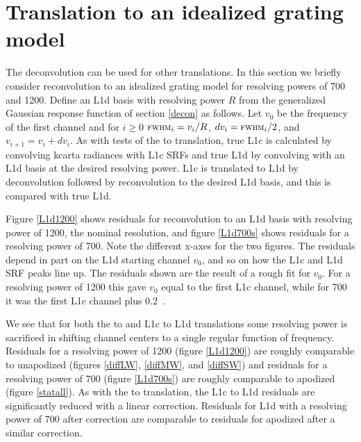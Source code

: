 \documentclass[11pt]{article}
\begin{document}
\FloatBarrier
\section{Translation to an idealized grating model}
\label{airsL1d}


The {\airs} deconvolution can be used for other translations.  
In this section we briefly consider reconvolution to an idealized
grating model for resolving powers of 700 and 1200.  Define an
{\airs} L1d basis with resolving power $R$ from the generalized
Gaussian response function of section \ref{decon} as follows.
Let $v_0$ be the frequency of the first channel and for $i\ge0$
$\mbox{\small\textsc{fwhm}}_i = v_i / R$, $dv_i = \mbox{\small\textsc{fwhm}}_i / 2$, and $v_{i+1} = v_i +
dv_i$.  As with tests of the {\airs} to {\cris} translation, true
L1c is calculated by convolving kcarta radiances with {\airs} L1c
SRFs and true L1d by convolving with an L1d basis at the desired
resolving power.  L1c is translated to L1d by deconvolution followed
by reconvolution to the desired L1d basis, and this is compared with
true L1d.

Figure \ref{L1d1200} shows residuals for reconvolution to an L1d
basis with resolving power of 1200, the nominal {\airs} resolution,
and figure \ref{L1d700s} shows residuals for a resolving power of
700.  Note the different x-axes for the two figures.  The residuals
depend in part on the L1d starting channel $v_0$, and so on how the
L1c and L1d SRF peaks line up.  The residuals shown are the result
of a rough fit for $v_0$.  For a resolving power of 1200 this gave
$v_0$ equal to the first L1c channel, while for 700 it was the first
L1c channel plus $0.2$~\wn.

We see that for both the {\airs} to {\cris} and L1c to L1d
translations some resolving power is sacrificed in shifting channel
centers to a single regular function of frequency.  Residuals for a
resolving power of 1200 (figure \ref{L1d1200}) are roughly
comparable to unapodized {\cris} (figures \ref{diffLW},
\ref{diffMW}, and \ref{diffSW}) and residuals for a resolving power
of 700 (figure \ref{L1d700s}) are roughly comparable to apodized
{\cris} (figure \ref{statall}).  As with the {\airs} to {\cris}
translation, the L1c to L1d residuals are significantly reduced with
a linear correction.  Residuals for L1d with a resolving power of
700 after correction are comparable to residuals for apodized
{\cris} after a similar correction.
\end{document}
